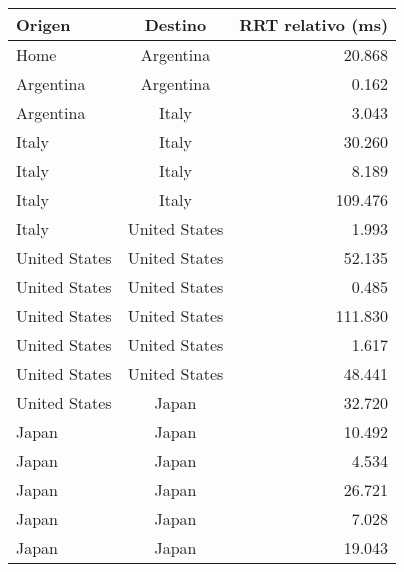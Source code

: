 \begin{center}
   \begin{tabular}{ |l | c | r | }
     \hline
     \textbf{Origen} & \textbf{Destino} & \textbf{RRT relativo (ms)} \\ \hline
     Home & Argentina & 20.868 \\ \hline
     Argentina & Argentina & 0.162 \\ \hline
     Argentina & Italy & 3.043 \\ \hline
     Italy & Italy & 30.260 \\ \hline
     Italy & Italy & 8.189 \\ \hline
     Italy & Italy & 109.476\\ \hline
     Italy & United States & 1.993\\ \hline
     United States & United States & 52.135 \\ \hline
     United States & United States & 0.485\\ \hline
     United States & United States & 111.830\\ \hline
     United States & United States & 1.617 \\ \hline
     United States & United States & 48.441 \\ \hline
     United States & Japan & 32.720 \\ \hline
     Japan & Japan & 10.492 \\ \hline
     Japan & Japan & 4.534 \\ \hline
     Japan & Japan & 26.721 \\ \hline
     Japan & Japan & 7.028 \\ \hline
     Japan & Japan & 19.043 \\ \hline
   \end{tabular}
 \end{center}

